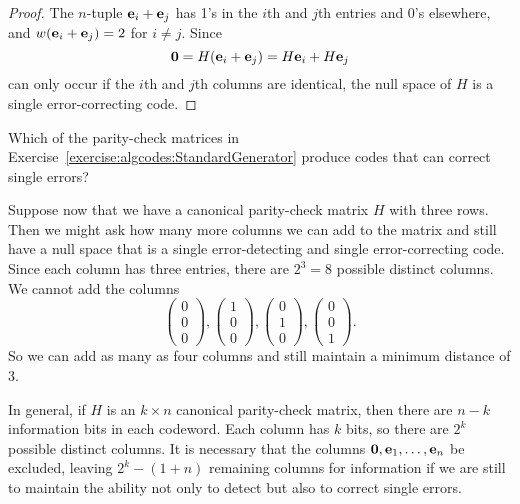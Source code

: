  
\begin{proof}
The $n$-tuple ${\bold e}_{i} +{\bold e}_{j}$ has 1's in the $i$th and
$j$th entries and 0's elsewhere, and $w( {\bold e}_{i} +{\bold
e}_{j}) = 2$ for $i \neq j$. Since
\[
{\bold 0}
= H({\bold e}_{i} +{\bold e}_{j})
= H{\bold e}_{i} + H{\bold e}_{j}
\]
can only occur if the $i$th and $j$th columns are identical, the
null space of $H$ is a single error-correcting code.
\end{proof}
 
 \begin{exercise}{}
 Which of the parity-check matrices in Exercise~\ref{exercise:algcodes:StandardGenerator} produce codes that can correct single errors?
 \end{exercise}
 
Suppose now that we have a canonical parity-check matrix $H$ with
three rows. Then we might ask how many more columns we can add to
the matrix and still have a null space that is a single
error-detecting and single error-correcting code. Since each column
has three entries, there are $2^3 = 8$ possible distinct columns. We
cannot add the columns 
\[
\left(
\begin{array}{c} 0 \\ 0 \\ 0 \end{array}
\right),
\left(
\begin{array}{c} 1 \\ 0 \\ 0 \end{array}
\right),
\left(
\begin{array}{c} 0 \\ 1 \\ 0 \end{array}
\right),
\left(
\begin{array}{c} 0 \\ 0 \\ 1 \end{array}
\right).
\]
So we can add as many as four columns and still maintain a minimum
distance of 3. 
 
 
In general, if $H$ is an $k \times n$ canonical parity-check matrix,
then there are $n-k$ information bits in each codeword. Each
column has $k$ bits, so there are $2^k$ possible distinct columns.
It is necessary that the columns ${\bold 0}, {\bold e}_1, \ldots,
{\bold e}_n$ be excluded, leaving $2^k - (1 + n)$ remaining columns for
information if we are still to maintain the ability not only to detect
but also to correct single errors. 
 
